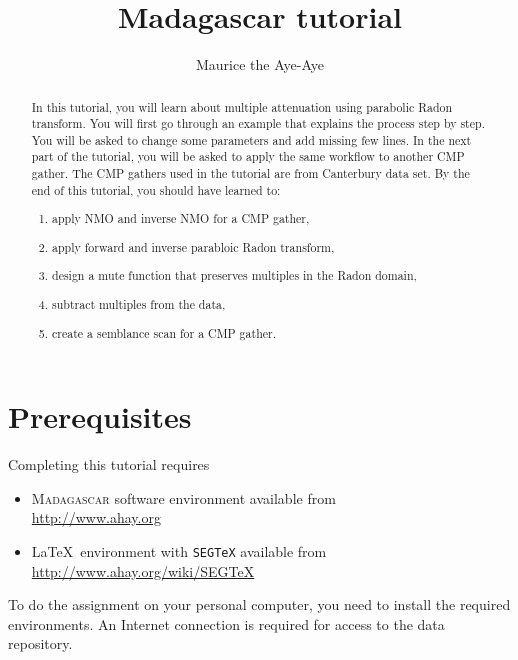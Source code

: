 \author{Maurice the Aye-Aye}
\title{Madagascar tutorial}


\maketitle

\begin{abstract}
  In this tutorial, you will learn about multiple attenuation using parabolic Radon transform. You will first go through an example that explains the process step by step. You will be asked to change some parameters and add missing few lines. In the next part of the tutorial, you will be asked to apply the same workflow to another CMP gather. The CMP gathers used in the tutorial are from Canterbury data set. By the end of this tutorial, you should have learned to:
  \begin{enumerate}
    \item apply NMO and inverse NMO for a CMP gather,
    \item apply forward and inverse parabloic Radon transform,
    \item design a mute function that preserves multiples in the Radon domain,
    \item subtract multiples from the data,
    \item create a semblance scan for a CMP gather.
  \end{enumerate}
\end{abstract}

\section{Prerequisites}

Completing this tutorial requires
\begin{itemize}
\item \textsc{Madagascar} software environment available from \\
\url{http://www.ahay.org}
\item \LaTeX\ environment with \texttt{SEGTeX} available from \\ 
\url{http://www.ahay.org/wiki/SEGTeX}
\end{itemize}
To do the assignment on your personal computer, you need to install
the required environments. An Internet connection is required for
access to the data repository.

